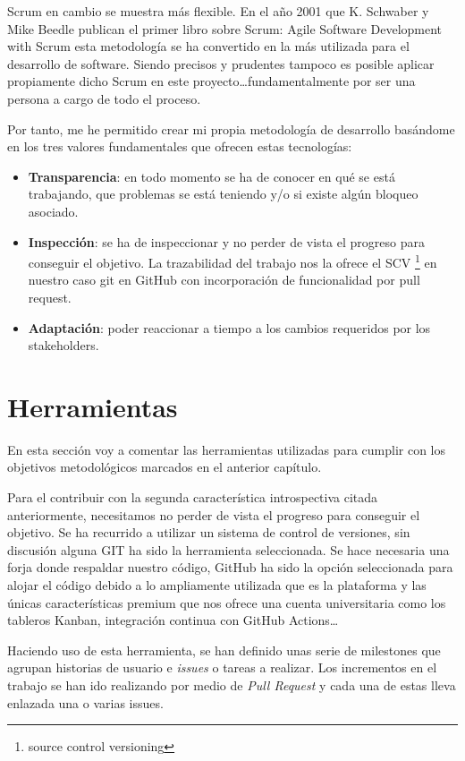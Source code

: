 Scrum en cambio se muestra más flexible. En el año 2001 que K. Schwaber y Mike Beedle
publican el primer libro sobre Scrum\cite{agile_book}: Agile Software Development with
Scrum esta metodología se ha convertido en la más utilizada para el desarrollo de
software. Siendo precisos y prudentes tampoco es posible aplicar propiamente dicho Scrum
en este proyecto\ldots fundamentalmente por ser una persona a cargo de todo el proceso.

Por tanto, me he permitido crear mi propia metodología de desarrollo basándome en los tres
valores fundamentales que ofrecen estas tecnologías:
\begin{itemize}
    \item \textbf{Transparencia}: en todo momento se ha de conocer en qué se está
    trabajando, que problemas se está teniendo y/o si existe algún bloqueo asociado.
    \item \textbf{Inspección}: se ha de inspeccionar y no perder de vista el progreso para
    conseguir el objetivo. La trazabilidad del trabajo nos la ofrece el SCV \footnote{source
    control versioning} en nuestro caso git en GitHub con incorporación de funcionalidad por pull
    request.
    \item \textbf{Adaptación}: poder reaccionar a tiempo a los cambios requeridos por los
    stakeholders.
\end{itemize}


\section{Herramientas}
En esta sección voy a comentar las herramientas utilizadas para cumplir con los objetivos
metodológicos marcados en el anterior capítulo.

Para el contribuir con la segunda característica introspectiva citada anteriormente,
necesitamos no perder de vista el progreso para conseguir el objetivo. Se ha recurrido a
utilizar un sistema de control de versiones, sin discusión alguna GIT ha sido la
herramienta seleccionada. Se hace necesaria una forja donde respaldar nuestro código,
GitHub ha sido la opción seleccionada para alojar el código debido a lo ampliamente
utilizada que es la plataforma y las únicas características premium que nos ofrece una cuenta universitaria como los
tableros Kanban, integración continua con GitHub Actions\ldots

Haciendo uso de esta herramienta, se han definido unas serie de milestones que agrupan
historias de usuario e \textit{issues} o tareas a realizar. Los incrementos en el trabajo se han
ido realizando por medio de \textit{Pull Request} y cada una de estas lleva enlazada una o varias
issues. 

